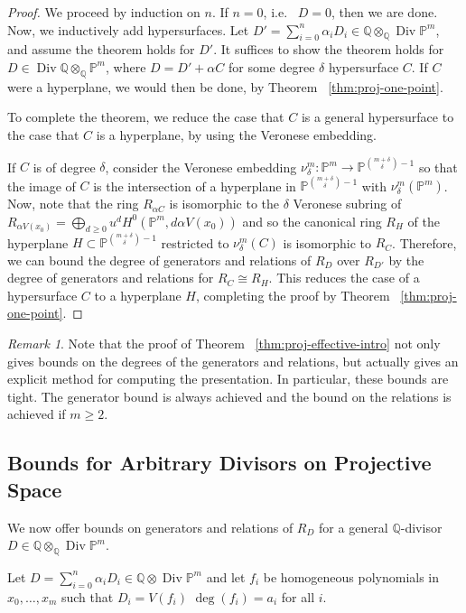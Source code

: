 \documentclass{amsart}
\theoremstyle{plain}
\theoremstyle{definition}
\theoremstyle{remark}
\newtheorem{rem}[thm]{Remark}
\numberwithin{equation}{section}
\newcommand\ssec{\subsection}
\newcommand\bq{{\mathbb Q}}
\newcommand\bp{{\mathbb P}}
\DeclareMathOperator\di{Div}
\newcommand\pdeg{\delta}
\begin{document}
\restateeffective*


\begin{proof}
We proceed by induction on $n$.
If $n = 0$, i.e.~ $D = 0$, then we are done.
Now, we inductively add hypersurfaces.
Let $D' = \sum_{i = 0}^{n} \alpha_i D_i \in \bq \otimes_\bq\di \bp^m$, 
and assume the theorem holds for $D'$. It suffices to show
the theorem holds for $D \in \di \bq \otimes_\bq \bp^m$, where $D = D' + \alpha C$ for some
degree $\pdeg$ hypersurface $C$.
If $C$ were a hyperplane, we would then be done, by Theorem ~\ref{thm:proj-one-point}.

To complete the theorem, we reduce the case that $C$ is a general hypersurface
to the case that $C$ is a hyperplane, by using the Veronese embedding.

If $C$ is of degree $\pdeg$, consider the Veronese embedding
$\nu_\pdeg^m \colon \bp^m \rightarrow \bp^{\binom{m+\pdeg}{\pdeg}-1}$
so that the image of $C$ is the intersection of 
a hyperplane in $\bp^{\binom{{m + \pdeg}}{\pdeg} - 1}$ with $\nu_\pdeg^m(\bp^m)$.
Now, note that the ring $R_{\alpha C}$ is isomorphic to the
$\pdeg$ Veronese subring of $R_{\alpha V(x_0)} = \bigoplus_{d \geq 0} u^d H^0(\bp^m, d \alpha V(x_0))$ and so
the canonical ring $R_H$ of the hyperplane $H \subset \bp^{\binom{m+\pdeg}{\pdeg}-1}$
restricted to $\nu_\pdeg^m(C)$ is isomorphic to $R_C$.
Therefore, we can bound the degree of generators and relations of
$R_D$ over $R_{D'}$ by the degree of generators and
relations for $R_C \cong R_H.$
This reduces the case of a hypersurface $C$ to
a hyperplane $H$, completing the proof by Theorem
~\ref{thm:proj-one-point}.
\end{proof}

\begin{rem}
\label{rem:exact-effective-bounds}
Note that the proof of Theorem ~\ref{thm:proj-effective-intro} not only gives bounds on the degrees of the generators and relations, but actually gives an explicit method for computing the presentation. In particular, these bounds are tight. The generator bound is always achieved and the bound on the relations is achieved if $m \geq 2$.
\end{rem}



\ssec{Bounds for Arbitrary Divisors on Projective Space}


We now offer bounds on generators and relations of $R_D$ for a general $\bq$-divisor $D \in \bq \otimes_\bq \di \bp^m$.

Let $D = \sum_{i=0}^n \alpha_i D_i \in \bq \otimes \di \bp^m$ and let $f_i$ be
homogeneous polynomials in $x_0, \ldots, x_m$ such that $D_i = V(f_i)$
$\deg(f_i) = a_i$ for all $i$. 
\end{document}
